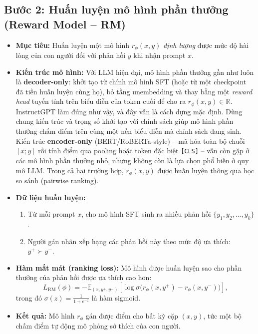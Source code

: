 \subsection*{Bước 2: Huấn luyện mô hình phần thưởng (Reward Model -- RM)}

\begin{itemize}
    \item \textbf{Mục tiêu:} Huấn luyện một mô hình \( r_{\phi}(x, y) \) \emph{định lượng} được mức độ hài lòng của con người đối với phản hồi \( y \) khi nhận prompt \( x \).

    \item \textbf{Kiến trúc mô hình:}
    Với LLM hiện đại, mô hình phần thưởng gần như luôn là \textbf{decoder-only}: khởi tạo từ chính mô hình SFT (hoặc từ một checkpoint đã tiền huấn luyện cùng họ), bỏ tầng unembedding và thay bằng một \emph{reward head} tuyến tính trên biểu diễn của token cuối để cho ra \( r_{\phi}(x, y) \in \mathbb{R} \). InstructGPT \cite{ouyang2022training} làm đúng như vậy, và đây vẫn là cách dựng mặc định. Dùng chung kiến trúc và trọng số khởi tạo với chính sách giúp mô hình phần thưởng chấm điểm trên cùng một nền biểu diễn mà chính sách đang sinh.
    Kiến trúc \textbf{encoder-only} (BERT/RoBERTa-style) -- mã hóa toàn bộ chuỗi \([x; y]\) rồi tính điểm qua pooling hoặc token đặc biệt \texttt{[CLS]} -- vẫn còn gặp ở các mô hình phần thưởng nhỏ, nhưng không còn là lựa chọn phổ biến ở quy mô LLM.
    Trong cả hai trường hợp, \( r_{\phi}(x, y) \) được huấn luyện thông qua học so sánh (pairwise ranking).

    \item \textbf{Dữ liệu huấn luyện:}
    \begin{enumerate}
        \item Từ mỗi prompt \( x \), cho mô hình SFT sinh ra nhiều phản hồi \( \{y_1, y_2, \dots, y_k\} \).
        \item Người gán nhãn xếp hạng các phản hồi này theo mức độ ưa thích: \( y^+ \succ y^- \).
    \end{enumerate}

    \item \textbf{Hàm mất mát (ranking loss):}
    Mô hình được huấn luyện sao cho phần thưởng của phản hồi được ưa thích cao hơn:
    \[
        L_{\text{RM}}(\phi)
        = - \mathbb{E}_{(x, y^+, y^-)} \left[
            \log \sigma \big( r_{\phi}(x, y^+) - r_{\phi}(x, y^-) \big)
        \right],
    \]
    trong đó \( \sigma(z) = \frac{1}{1 + e^{-z}} \) là hàm sigmoid.
    \item \textbf{Kết quả:} Mô hình \( r_{\phi} \) gán được điểm cho bất kỳ cặp \((x, y)\), tức một bộ chấm điểm tự động mô phỏng sở thích của con người.
\end{itemize}

